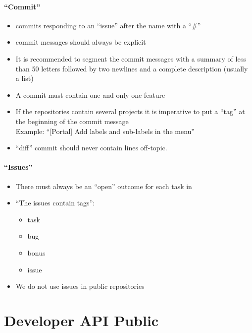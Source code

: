 \documentclass{life-fr}
\begin{document}
\subsubsection{``Commit''}

\begin{itemize}
  \item commits responding to an ``issue'' after the name with a ``\#''
  \item commit messages should always be explicit
  \item It is recommended to segment the commit messages with a
    summary of less than 50 letters followed by two newlines
    and a complete description (usually a list)
  \item A commit must contain one and only one feature
  \item If the repositories contain several projects
    it is imperative to put a ``tag'' at the beginning of the commit message \\
    Example: ``[Portal] Add labels and sub-labels in the menu''
  \item ``diff'' commit should never contain lines
    off-topic.
\end{itemize}

\subsubsection{``Issues''}

\begin{itemize}
  \item There must always be an ``open'' outcome for each task in
  \item ``The issues contain tags'':
    \begin{itemize}
      \item task
      \item bug
      \item bonus
      \item issue
    \end{itemize}
    \item We do not use issues in public repositories
\end{itemize}



\chapter{Developer API Public}
\end{document}
